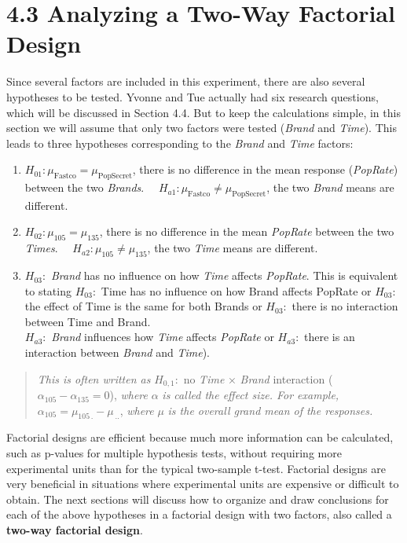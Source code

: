 \documentclass[
]{report}
\begin{document}
\section{4.3 Analyzing a Two-Way Factorial Design}\label{analyzing-a-two-way-factorial-design}

Since several factors are included in this experiment, there are also several hypotheses to be tested. Yvonne and Tue actually had six research questions, which will be discussed in Section 4.4. But to keep the calculations simple, in this section we will assume that only two factors were tested (\emph{Brand} and \emph{Time}). This leads to three hypotheses corresponding to the \emph{Brand} and \emph{Time} factors:

\begin{enumerate}
\def\labelenumi{\arabic{enumi}.}
\item
  \(H_{01}: \mu_{\text{Fastco}} = \mu_{\text{PopSecret}}\), there is no difference in the mean response (\emph{PopRate}) between the two \emph{Brands}.
  \(\quad H_{a1}: \mu_{\text{Fastco}} \neq \mu_{\text{PopSecret}}\), the two \emph{Brand} means are different.
\item
  \(H_{02}: \mu_{105} = \mu_{135}\), there is no difference in the mean \emph{PopRate} between the two \emph{Times}.
  \(\quad H_{a2}: \mu_{105} \neq \mu_{135}\), the two \emph{Time} means are different.
\item
  \(H_{03}:\) \emph{Brand} has no influence on how \emph{Time} affects \emph{PopRate}. This is equivalent to stating \(H_{03}:\) Time has no influence on how Brand affects PopRate or \(H_{03}:\) the effect of Time is the same for both Brands or \(H_{03}:\) there is no interaction between Time and Brand.\\
  \(H_{a3}:\) \emph{Brand} influences how \emph{Time} affects \emph{PopRate} or \(H_{a3}:\) there is an interaction between \emph{Brand} and \emph{Time}).
\end{enumerate}

\begin{quote}
\emph{This is often written as} \(H_{0,1}:\) no \emph{Time} × \emph{Brand} interaction (\(\alpha_{105} - \alpha_{135} = 0\)), \emph{where} \(\alpha\) \emph{is called the effect size. For example,} \(\alpha_{105} = \mu_{105\,.} - \mu_{\,..}\), \emph{where} \(\mu\) \emph{is the overall grand mean of the responses.}
\end{quote}

Factorial designs are efficient because much more information can be calculated, such as p-values for
multiple hypothesis tests, without requiring more experimental units than for the typical two-sample t-test.
Factorial designs are very beneficial in situations where experimental units are expensive or difficult to obtain.
The next sections will discuss how to organize and draw conclusions for each of the above hypotheses in a
factorial design with two factors, also called a \textbf{two-way factorial design}.
\end{document}
